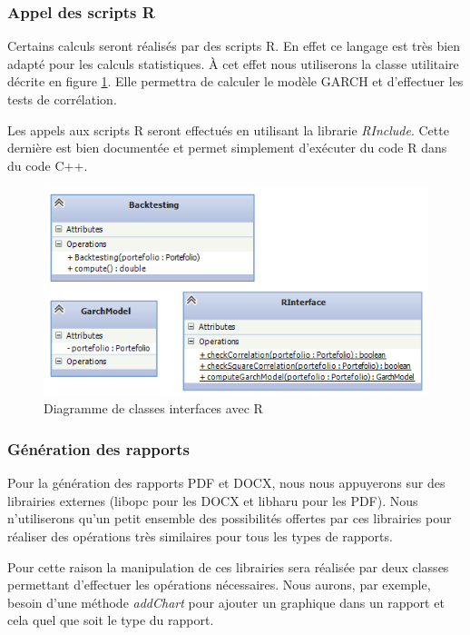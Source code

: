 \documentclass[a4paper]{report}
\begin{document}
\subsubsection{Appel des scripts R}

Certains calculs seront réalisés par des scripts R.
En effet ce langage est très bien adapté pour les calculs statistiques.
\`A cet effet nous utiliserons la classe utilitaire décrite en figure \ref{fig:diagramme-classes-interface-r}. Elle permettra de calculer le modèle GARCH et d'effectuer les tests de corrélation.

Les appels aux scripts R seront effectués en utilisant la librarie \textit{RInclude}. Cette dernière est bien documentée et permet simplement d'exécuter du code R dans du code C++.

\begin{figure}
  	\center
  	\includegraphics[width=1\textwidth]{diagramme-classes-interface-r.png}
  	\caption{Diagramme de classes interfaces avec R}
  	\label{fig:diagramme-classes-interface-r}
\end{figure}


\subsubsection{Génération des rapports}

Pour la génération des rapports PDF et DOCX, nous nous appuyerons sur des librairies externes (libopc pour les DOCX et libharu pour les PDF).
Nous n'utiliserons qu'un petit ensemble des possibilités offertes par ces librairies pour réaliser des opérations très similaires pour tous les types de rapports.

Pour cette raison la manipulation de ces librairies sera réalisée par deux classes permettant d'effectuer les opérations nécessaires.
Nous aurons, par exemple, besoin d'une méthode \textit{addChart} pour ajouter un graphique dans un rapport et cela quel que soit le type du rapport.
\end{document}
